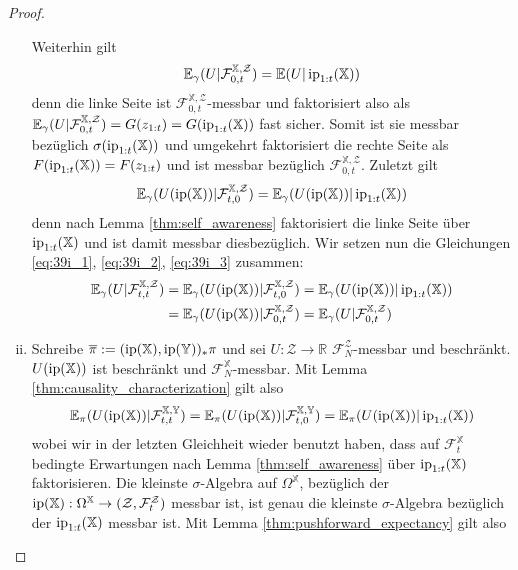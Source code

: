 \begin{proof}
\begin{enumerate}[(i)]
Weiterhin gilt
\begin{equation}\label{eq:39i_2}
\mathbb{E}_\gamma(U \vert \mathcal{F}_{0, t}^{\mathbb{X}, \mathcal{Z}}) = \mathbb{E}(U \vert \operatorname{ip}_{1:t}(\mathbb{X}))
\end{equation}
denn die linke Seite ist $\mathcal{F}_{0, t}^{\mathbb{X}, \mathcal{Z}}$-messbar und faktorisiert also als $\mathbb{E}_\gamma(U \vert \mathcal{F}_{0,t}^{\mathbb{X}, \mathcal{Z}}) = G(z_{1:t})=G(\operatorname{ip}_{1:t}(\mathbb{X}))$ fast sicher. Somit ist sie messbar bezüglich $\sigma(\operatorname{ip}_{1:t}(\mathbb{X}))$ und umgekehrt faktorisiert die rechte Seite als $F(\operatorname{ip}_{1:t}(\mathbb{X}))=F(z_{1:t})$ und ist messbar bezüglich $\mathcal{F}_{0,t}^{\mathbb{X}, \mathcal{Z}}$.
Zuletzt gilt 
\begin{equation}\label{eq:39i_3}
\mathbb{E}_\gamma(U(\operatorname{ip}(\mathbb{X}))\vert \mathcal{F}_{t, 0}^{\mathbb{X}, \mathcal{Z}}) = \mathbb{E}_\gamma(U(\operatorname{ip}(\mathbb{X})) \vert \operatorname{ip}_{1:t}(\mathbb{X}))
\end{equation}
denn nach Lemma \ref{thm:self_awareness} faktorisiert die linke Seite über $\operatorname{ip}_{1:t}(\mathbb{X})$ und ist damit messbar diesbezüglich. Wir setzen nun die Gleichungen \ref{eq:39i_1}, \ref{eq:39i_2}, \ref{eq:39i_3} zusammen:
\begin{align*}
    \mathbb{E}_\gamma(U \vert \mathcal{F}_{t,t}^{\mathbb{X}, \mathcal{Z}}) &= \mathbb{E}_\gamma(U(\operatorname{ip}(\mathbb{X})) \vert \mathcal{F}_{t, 0}^{\mathbb{X}, \mathcal{Z}}) 
    = \mathbb{E}_\gamma(U(\operatorname{ip}(\mathbb{X}))\vert \operatorname{ip}_{1:t}(\mathbb{X})) \\
    &= \mathbb{E}_\gamma(U(\operatorname{ip}(\mathbb{X}))\vert \mathcal{F}_{0, t}^{\mathbb{X}, \mathcal{Z}}) = \mathbb{E}_\gamma(U \vert \mathcal{F}_{0, t}^{\mathbb{X}, \mathcal{Z}})
\end{align*}
\item Schreibe $\overline\pi:=(\operatorname{ip}(\mathbb{X}), \operatorname{ip}(\mathbb{Y}))_* \pi$ und sei $U:\mathcal{Z}\rightarrow \mathbb{R}$ $\mathcal{F}_{N}^{\mathcal{Z}}$-messbar und beschränkt. $U(\operatorname{ip}(\mathbb{X}))$ ist beschränkt und $\mathcal{F}_N^\mathbb{X}$-messbar. Mit Lemma \ref{thm:causality_characterization} gilt also
\begin{equation}\label{eq:310_0}
    \mathbb{E}_\pi(U(\operatorname{ip}(\mathbb{X}))\vert \mathcal{F}_{t,t}^{\mathbb{X}, \mathbb{Y}}) = \mathbb{E}_\pi(U(\operatorname{ip}(\mathbb{X}))\vert \mathcal{F}_{t, 0}^{\mathbb{X}, \mathbb{Y}}) = \mathbb{E}_\pi(U(\operatorname{ip}(\mathbb{X})) \vert \operatorname{ip}_{1:t}(\mathbb{X}))
\end{equation}
wobei wir in der letzten Gleichheit wieder benutzt haben, dass auf $\mathcal{F}_t^\mathbb{X}$ bedingte Erwartungen nach Lemma \ref{thm:self_awareness} über $\operatorname{ip}_{1:t}(\mathbb{X})$ faktorisieren. Die kleinste $\sigma$-Algebra auf $\Omega^\mathbb{X}$, bezüglich der $\operatorname{ip}(\mathbb{X}): \Omega^{\mathbb{X}} \rightarrow (\mathcal{Z}, \mathcal{F}_t^\mathcal{Z})$ messbar ist, ist genau die kleinste $\sigma$-Algebra bezüglich der $\operatorname{ip}_{1:t}(\mathbb{X})$ messbar ist. Mit Lemma \ref{thm:pushforward_expectancy} gilt also

\end{enumerate}
\end{proof}
